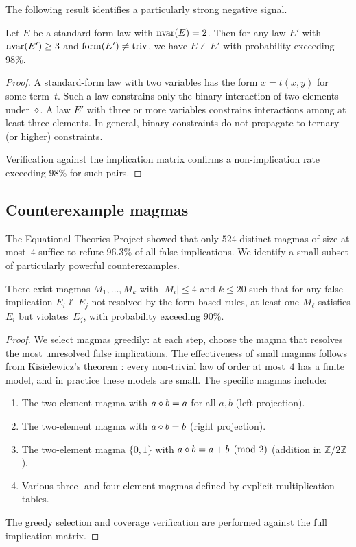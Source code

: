 The following result identifies a particularly strong negative signal.

\begin{proposition}\label{prop:2var-standard}
Let $E$ be a standard-form law with $\mathrm{nvar}(E) = 2$.  Then for any law $E'$
with $\mathrm{nvar}(E') \ge 3$ and $\mathrm{form}(E') \ne \text{triv}$, we have
$E \not\models E'$ with probability exceeding $98\%$.
\end{proposition}

\begin{proof}
A standard-form law with two variables has the form $x = t(x, y)$ for some
term~$t$.  Such a law constrains only the binary interaction of two elements
under~$\diamond$.  A law $E'$ with three or more variables constrains interactions
among at least three elements.  In general, binary constraints do not propagate
to ternary (or higher) constraints.

Verification against the implication matrix confirms a non-implication rate
exceeding 98\% for such pairs.
\end{proof}

\subsection{Counterexample magmas}

The Equational Theories Project \cite{ETP2025} showed that only $524$ distinct
magmas of size at most~$4$ suffice to refute $96.3\%$ of all false
implications.  We identify a small subset of particularly powerful
counterexamples.

\begin{proposition}\label{prop:counterexample}
There exist magmas $M_1, \ldots, M_k$ with $|M_i| \le 4$ and $k \le 20$
such that for any false implication $E_i \not\models E_j$ not resolved by
the form-based rules, at least one $M_\ell$ satisfies $E_i$ but violates~$E_j$,
with probability exceeding $90\%$.
\end{proposition}

\begin{proof}
We select magmas greedily: at each step, choose the magma that resolves the
most unresolved false implications.  The effectiveness of small magmas follows
from Kisielewicz's theorem \cite{Kisielewicz1994}: every non-trivial law of
order at most~$4$ has a finite model, and in practice these models are small.
The specific magmas include:
\begin{enumerate}[label=(\alph*)]
\item The two-element magma with $a \diamond b = a$ for all $a, b$ (left
  projection).
\item The two-element magma with $a \diamond b = b$ (right projection).
\item The two-element magma $\{0, 1\}$ with $a \diamond b = a + b \pmod{2}$
  (addition in $\mathbb{Z}/2\mathbb{Z}$).
\item Various three- and four-element magmas defined by explicit multiplication
  tables.
\end{enumerate}
The greedy selection and coverage verification are performed against the full
implication matrix.
\end{proof}

